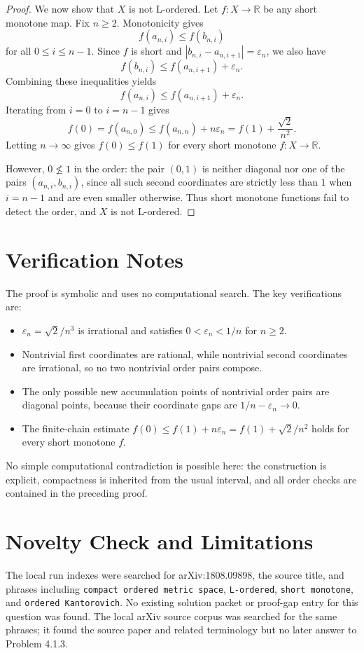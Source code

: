 \documentclass[11pt]{article}
\newcommand{\R}{\mathbb R}
\newcommand{\eps}{\varepsilon}
\begin{document}
\begin{proof}
We now show that $X$ is not L-ordered.  Let $f:X\to\R$ be any short monotone
map.  Fix $n\ge2$.  Monotonicity gives
\[
  f(a_{n,i})\le f(b_{n,i})
\]
for all $0\le i\le n-1$.  Since $f$ is short and
$|b_{n,i}-a_{n,i+1}|=\eps_n$, we also have
\[
  f(b_{n,i})\le f(a_{n,i+1})+\eps_n .
\]
Combining these inequalities yields
\[
  f(a_{n,i})\le f(a_{n,i+1})+\eps_n.
\]
Iterating from $i=0$ to $i=n-1$ gives
\[
  f(0)=f(a_{n,0})
  \le f(a_{n,n})+n\eps_n
  = f(1)+\frac{\sqrt2}{n^2}.
\]
Letting $n\to\infty$ gives $f(0)\le f(1)$ for every short monotone
$f:X\to\R$.

However, $0\nleq 1$ in the order: the pair $(0,1)$ is neither diagonal nor
one of the pairs $(a_{n,i},b_{n,i})$, since all such second coordinates are
strictly less than $1$ when $i=n-1$ and are even smaller otherwise.  Thus
short monotone functions fail to detect the order, and $X$ is not
L-ordered.
\end{proof}

\section*{Verification Notes}

The proof is symbolic and uses no computational search.  The key verifications
are:
\begin{itemize}
\item $\eps_n=\sqrt2/n^3$ is irrational and satisfies $0<\eps_n<1/n$ for
  $n\ge2$.
\item Nontrivial first coordinates are rational, while nontrivial second
  coordinates are irrational, so no two nontrivial order pairs compose.
\item The only possible new accumulation points of nontrivial order pairs are
  diagonal points, because their coordinate gaps are $1/n-\eps_n\to0$.
\item The finite-chain estimate
  $f(0)\le f(1)+n\eps_n=f(1)+\sqrt2/n^2$ holds for every short monotone
  $f$.
\end{itemize}

No simple computational contradiction is possible here: the construction is
explicit, compactness is inherited from the usual interval, and all order
checks are contained in the preceding proof.

\section*{Novelty Check and Limitations}

The local run indexes were searched for arXiv:1808.09898, the source title,
and phrases including \texttt{compact ordered metric space},
\texttt{L-ordered}, \texttt{short monotone}, and
\texttt{ordered Kantorovich}.  No existing solution packet or proof-gap entry
for this question was found.  The local arXiv source corpus was searched for
the same phrases; it found the source paper and related terminology but no
later answer to Problem 4.1.3.
\end{document}
